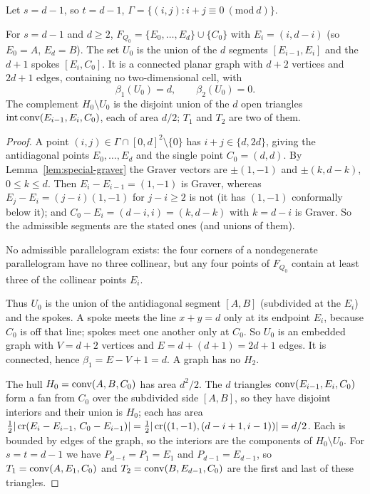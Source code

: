 Let $s=d-1$, so $t=d-1$, $\Gamma=\{(i,j):i+j\equiv0\ (\mathrm{mod}\ d)\}$.

\begin{proposition}\label{prop:special-fan}
For $s=d-1$ and $d\ge2$, $F_{Q_0}=\{E_0,\dots,E_d\}\cup\{C_0\}$ with $E_i=(i,d-i)$ (so $E_0=A$, $E_d=B$). The set $U_0$ is the union of the $d$ segments $[E_{i-1},E_i]$ and the $d+1$ spokes $[E_i,C_0]$. It is a connected planar graph with $d+2$ vertices and $2d+1$ edges, containing no two-dimensional cell, with
\[
  \beta_1(U_0)=d,\qquad\beta_2(U_0)=0.
\]
The complement $H_0\setminus U_0$ is the disjoint union of the $d$ open triangles $\operatorname{int}\operatorname{conv}(E_{i-1},E_i,C_0)$, each of area $d/2$; $T_1$ and $T_2$ are two of them.
\end{proposition}
\begin{proof}
A point $(i,j)\in\Gamma\cap[0,d]^2\setminus\{0\}$ has $i+j\in\{d,2d\}$, giving the antidiagonal points $E_0,\dots,E_d$ and the single point $C_0=(d,d)$. By Lemma~\ref{lem:special-graver} the Graver vectors are $\pm(1,-1)$ and $\pm(k,d-k)$, $0\le k\le d$. Then $E_i-E_{i-1}=(1,-1)$ is Graver, whereas $E_j-E_i=(j-i)(1,-1)$ for $j-i\ge2$ is not (it has $(1,-1)$ conformally below it); and $C_0-E_i=(d-i,i)=(k,d-k)$ with $k=d-i$ is Graver. So the admissible segments are the stated ones (and unions of them).

No admissible parallelogram exists: the four corners of a nondegenerate parallelogram have no three collinear, but any four points of $F_{Q_0}$ contain at least three of the collinear points $E_i$.

Thus $U_0$ is the union of the antidiagonal segment $[A,B]$ (subdivided at the $E_i$) and the spokes. A spoke meets the line $x+y=d$ only at its endpoint $E_i$, because $C_0$ is off that line; spokes meet one another only at $C_0$. So $U_0$ is an embedded graph with $V=d+2$ vertices and $E=d+(d+1)=2d+1$ edges. It is connected, hence $\beta_1=E-V+1=d$. A graph has no $H_2$.

The hull $H_0=\operatorname{conv}(A,B,C_0)$ has area $d^2/2$. The $d$ triangles $\operatorname{conv}(E_{i-1},E_i,C_0)$ form a fan from $C_0$ over the subdivided side $[A,B]$, so they have disjoint interiors and their union is $H_0$; each has area $\tfrac12|\operatorname{cr}(E_i-E_{i-1},\,C_0-E_{i-1})|=\tfrac12|\operatorname{cr}((1,-1),(d-i+1,i-1))|=d/2$. Each is bounded by edges of the graph, so the interiors are the components of $H_0\setminus U_0$. For $s=t=d-1$ we have $P_{d-t}=P_1=E_1$ and $P_{d-1}=E_{d-1}$, so $T_1=\operatorname{conv}(A,E_1,C_0)$ and $T_2=\operatorname{conv}(B,E_{d-1},C_0)$ are the first and last of these triangles.
\end{proof}

